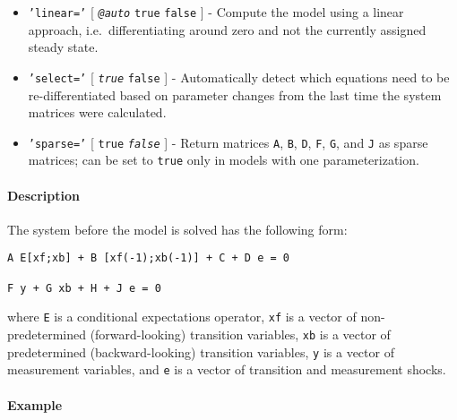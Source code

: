 \begin{itemize}
\item
  \texttt{'linear='} {[} \emph{\texttt{@auto}} \textbar{} \texttt{true}
  \textbar{} \texttt{false} {]} - Compute the model using a linear
  approach, i.e.~differentiating around zero and not the currently
  assigned steady state.
\item
  \texttt{'select='} {[} \emph{\texttt{true}} \textbar{} \texttt{false}
  {]} - Automatically detect which equations need to be
  re-differentiated based on parameter changes from the last time the
  system matrices were calculated.
\item
  \texttt{'sparse='} {[} \texttt{true} \textbar{} \emph{\texttt{false}}
  {]} - Return matrices \texttt{A}, \texttt{B}, \texttt{D}, \texttt{F},
  \texttt{G}, and \texttt{J} as sparse matrices; can be set to
  \texttt{true} only in models with one parameterization.
\end{itemize}

\paragraph{Description}\label{description}

The system before the model is solved has the following form:

\begin{verbatim}
A E[xf;xb] + B [xf(-1);xb(-1)] + C + D e = 0

F y + G xb + H + J e = 0
\end{verbatim}

where \texttt{E} is a conditional expectations operator, \texttt{xf} is
a vector of non-predetermined (forward-looking) transition variables,
\texttt{xb} is a vector of predetermined (backward-looking) transition
variables, \texttt{y} is a vector of measurement variables, and
\texttt{e} is a vector of transition and measurement shocks.

\paragraph{Example}\label{example}


